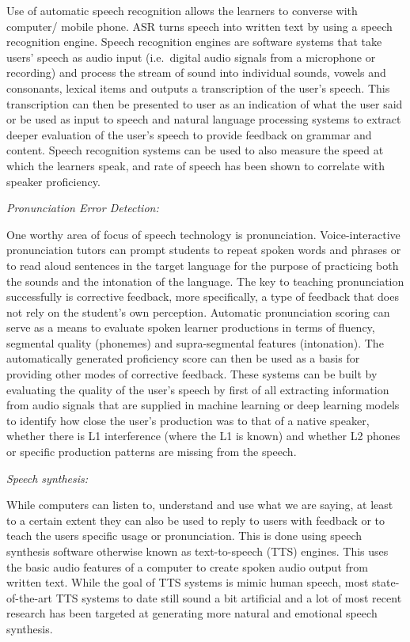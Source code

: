 \documentclass[
]{book}
\begin{document}
Use of automatic speech recognition allows the learners to converse with computer/ mobile phone. ASR turns speech into written text by using a speech recognition engine. Speech recognition engines are software systems that take users' speech as audio input (i.e.~digital
audio signals from a microphone or recording) and process the stream of sound into individual sounds, vowels and consonants, lexical items and outputs a transcription of the user's speech. This transcription can then be presented to user as an indication of what the user said or be used as input to speech and natural language processing systems to extract deeper evaluation of the user's speech to provide feedback on grammar and content. Speech recognition systems can be used to also measure the speed at which the learners speak, and rate of speech has been shown to correlate with speaker proficiency.

\emph{Pronunciation Error Detection:}

One worthy area of focus of speech technology is pronunciation. Voice-interactive pronunciation tutors can prompt students to repeat spoken words and phrases or to read aloud sentences in the target language for the purpose of practicing both the sounds and the intonation of the language. The key to teaching pronunciation successfully is corrective feedback, more specifically, a type of feedback that does not rely on the student's own perception. Automatic pronunciation scoring can serve as a means to evaluate spoken learner productions in terms of fluency, segmental quality (phonemes) and supra-segmental features (intonation). The automatically generated proficiency score can then be used as a basis for providing other modes of corrective feedback. These systems can be built by evaluating the quality of the user's speech by first of all extracting information from audio signals that are supplied in machine learning or deep learning models to identify how close the user's production was to that of a native speaker, whether there is L1 interference (where the L1 is known) and whether L2 phones or specific production patterns are missing from the speech.

\emph{Speech synthesis:}

While computers can listen to, understand and use what we are saying, at least to a certain extent they can also be used to reply to users with feedback or to teach the users specific usage or pronunciation. This is done using speech synthesis software otherwise known as text-to-speech (TTS) engines. This uses the basic audio features of a computer to create spoken audio output from written text. While the goal of TTS systems is mimic human speech, most state-of-the-art TTS systems to date still sound a bit artificial and a lot of most recent research has been targeted at generating more natural and emotional speech synthesis.
\end{document}
